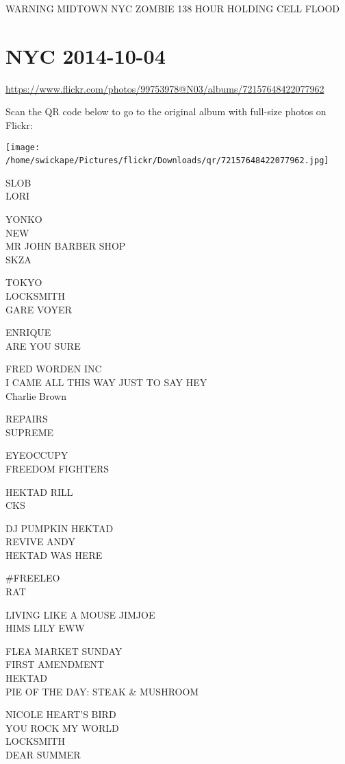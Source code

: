 \documentclass[10pt,letterpaper]{article}
\begin{document}
WARNING MIDTOWN NYC ZOMBIE 138 HOUR HOLDING CELL FLOOD
\

\section*{NYC 2014-10-04}

\url{https://www.flickr.com/photos/99753978@N03/albums/72157648422077962}

Scan the QR code below to go to the original album with full-size photos on Flickr:

\texttt{[image: /home/swickape/Pictures/flickr/Downloads/qr/72157648422077962.jpg]}
\

SLOB\\
LORI

YONKO\\
NEW\\
MR JOHN BARBER SHOP\\
SKZA

TOKYO\\
LOCKSMITH\\
GARE VOYER

ENRIQUE\\
ARE YOU SURE

FRED WORDEN INC\\
I CAME ALL THIS WAY JUST TO SAY HEY\\
Charlie Brown

REPAIRS\\
SUPREME

EYEOCCUPY\\
FREEDOM FIGHTERS

HEKTAD RILL\\
CKS

DJ PUMPKIN HEKTAD\\
REVIVE ANDY\\
HEKTAD WAS HERE

\#FREELEO\\
RAT

LIVING LIKE A MOUSE JIMJOE\\
HIMS LILY EWW

FLEA MARKET SUNDAY\\
FIRST AMENDMENT\\
HEKTAD\\
PIE OF THE DAY: STEAK \& MUSHROOM

NICOLE HEART'S BIRD\\
YOU ROCK MY WORLD\\
LOCKSMITH\\
DEAR SUMMER
\end{document}
